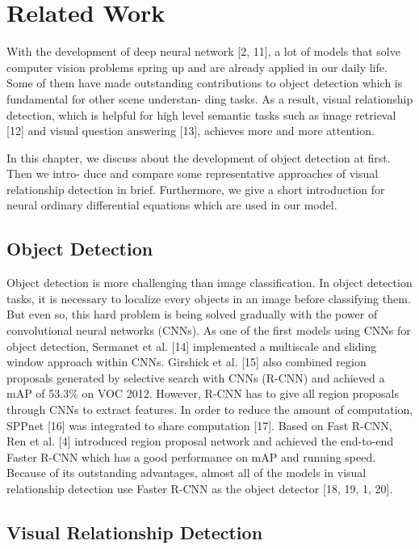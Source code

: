 \chapter{Related Work}
\label{chap:relatedwork}
With the development of deep neural network [2, 11], a lot of models that solve computer vision problems spring up and are already applied in our daily life. Some of them have made outstanding contributions to object detection which is fundamental for other scene understan- ding tasks. As a result, visual relationship detection, which is helpful for high level semantic tasks such as image retrieval [12] and visual question answering [13], achieves more and more attention.

In this chapter, we discuss about the development of object detection at first. Then we intro- duce and compare some representative approaches of visual relationship detection in brief. Furthermore, we give a short introduction for neural ordinary differential equations which are used in our model.

\section{Object Detection}
Object detection is more challenging than image classification. In object detection tasks, it is necessary to localize every objects in an image before classifying them. But even so, this hard problem is being solved gradually with the power of convolutional neural networks (CNNs). As one of the first models using CNNs for object detection, Sermanet et al. [14] implemented a multiscale and sliding window approach within CNNs. Girshick et al. [15] also combined region proposals generated by selective search with CNNs (R-CNN) and achieved a mAP of 53.3\% on VOC 2012. However, R-CNN has to give all region proposals through CNNs to extract features. In order to reduce the amount of computation, SPPnet [16] was integrated to share computation [17]. Based on Fast R-CNN, Ren et al. [4] introduced region proposal network and achieved the end-to-end Faster R-CNN which has a good performance on mAP and running speed. Because of its outstanding advantages, almost all of the models in visual relationship detection use Faster R-CNN as the object detector [18, 19, 1, 20].

\section{Visual Relationship Detection}

